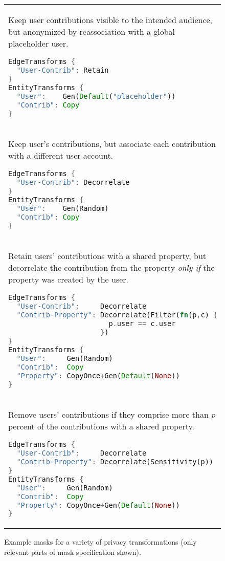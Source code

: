 \begin{figure}[h!]
    \footnotesize
    \begin{tabular}{p{}}
Keep user contributions visible to the intended audience, but anonymized by reassociation with a global
placeholder user.
\begin{lstlisting}[language=Rust]
EdgeTransforms {
  "User-Contrib": Retain
}
EntityTransforms {
  "User":    Gen(Default("placeholder")) 
  "Contrib": Copy
}
\end{lstlisting}

    \\

Keep user's contributions, but associate each contribution with a different user account.
\begin{lstlisting}[language=Rust]
EdgeTransforms {
  "User-Contrib": Decorrelate
}
EntityTransforms {
  "User":    Gen(Random)
  "Contrib": Copy
}
\end{lstlisting}

\\
Retain users' contributions with a shared property, but decorrelate the contribution
from the property \emph{only if} the property was created by
the user.
\begin{lstlisting}[language=Rust]
EdgeTransforms {
  "User-Contrib":     Decorrelate
  "Contrib-Property": Decorrelate(Filter(fn(p,c) {
                        p.user == c.user
                      })
}
EntityTransforms {
  "User":     Gen(Random)
  "Contrib":  Copy
  "Property": CopyOnce+Gen(Default(None)) 
}
\end{lstlisting}

        \\

Remove users' contributions if they comprise more than $p$ percent of the contributions
with a shared property.
\begin{lstlisting}[language=Rust]
EdgeTransforms {
  "User-Contrib":     Decorrelate
  "Contrib-Property": Decorrelate(Sensitivity(p))
}
EntityTransforms {
  "User":     Gen(Random)
  "Contrib":  Copy
  "Property": CopyOnce+Gen(Default(None)) 
}
\end{lstlisting}
\end{tabular}
\caption{Example masks for a variety of privacy transformations (only relevant parts of mask
specification shown).}
\label{fig:masks}
\end{figure}
